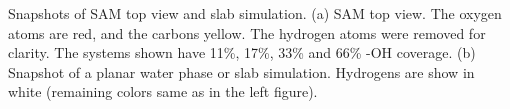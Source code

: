 Snapshots of SAM top view and slab simulation. (a) SAM top view.
The oxygen atoms are red, and the carbons yellow. The hydrogen atoms
were removed for clarity. The systems shown have 11\%, 17\%, 33\%
and 66\% -OH coverage. (b) Snapshot of a planar water phase or slab
simulation. Hydrogens are show in white (remaining colors same as
in the left figure). \cite{humphrey:1996}